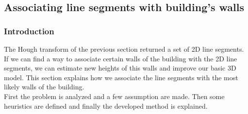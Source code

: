 \documentclass[10pt]{article}
\begin{document}
{\subsection{Associating line segments with building's walls}
%
% 
% 

	\subsubsection{Introduction}
	The Hough transform of the previous section returned a set of 2D line
	segments.  If we can find a way to associate certain walls of the building with
	the 2D line segments, we can estimate new heights of this walls and improve our basic 3D model.
	This section explains how we associate the line segments with the most
	likely walls of the building. \\
	First the problem is analyzed and a few assumption are made.  Then some
	heuristics are defined and finally the developed method is explained.
}
\end{document}

